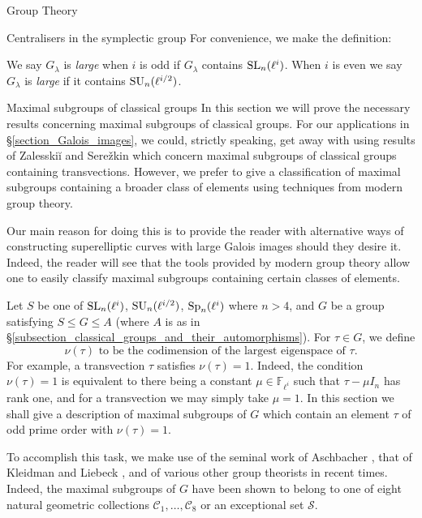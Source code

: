 \documentclass[11pt,a4paper]{article}
\newcommand{\Fli}{\mathbb{F}_{\ell^i}}
\newcommand{\Glam}{G_{\lambda}}
\newcommand{\C}{\mathcal{C}}
\begin{document}
\begin{section}{Group Theory}
\begin{subsection}{Centralisers in the symplectic group}
For convenience, we make the definition:
\begin{definition}
We say $\Glam$ is \emph{large} when $i$ is odd if  $\Glam$ contains
 $\SL_{n}(\ell^i)$. When $i$ is even we say $\Glam$ is \emph{large} if  it contains
 $\SU_{n}(\ell^{i/2})$.
\end{definition}

\end{subsection}

\begin{subsection}{Maximal subgroups of classical groups}
\label{subsection_maximal_subgroups}
In this section we will prove the necessary results concerning maximal subgroups of classical groups.
For our applications in \S \ref{section_Galois_images}, we could, strictly speaking, get away with using results of  Zalesski\u{i} and Sere\v{z}kin \cite{Zalesskii_Serezkin_transvections_paper}  which concern maximal subgroups of classical groups containing transvections.
However, we prefer to give a classification of maximal subgroups containing a broader class of elements using techniques from modern group theory.

Our main reason for doing this is to provide the reader with alternative ways of constructing superelliptic curves with large Galois images should they desire it.
Indeed, the reader will see that the tools provided by modern group theory allow one to easily classify maximal subgroups containing certain classes of elements.




Let $S$ be one of $\SL_n(\ell^i)$, $\SU_n(\ell^{i/2})$, $\Sp_n(\ell^i)$ where $n>4$, and $G$ be a group satisfying $S \leq G \leq A$ (where $A$ is as in \S \ref{subsection_classical_groups_and_their_automorphisms}). For $\tau \in G$, we define $$ \nu(\tau) \text{ to be the codimension of the largest eigenspace of } \tau .$$ For example, a transvection $\tau$ satisfies $\nu(\tau)=1$.
Indeed, the condition $\nu(\tau)=1$ is equivalent to there being a constant $\mu \in \Fli$ such that $\tau - \mu I_n$ has rank one, and for a transvection we may simply take $\mu=1$.
In this section we shall give a description of maximal subgroups of $G$ which contain an element $\tau$ of odd prime order with $\nu(\tau) =1$.

To accomplish this task, we make use of the seminal work of Aschbacher \cite{Aschbacher}, that of Kleidman and Liebeck \cite{KleidmanLiebeck}, and of various other group theorists in recent times. Indeed, the maximal subgroups of $G$ have been shown to belong to one of eight natural geometric collections $\C_1, \ldots, \C_8$ or an exceptional set $\mathcal{S}$. 


\end{subsection}
\end{section}
\end{document}
